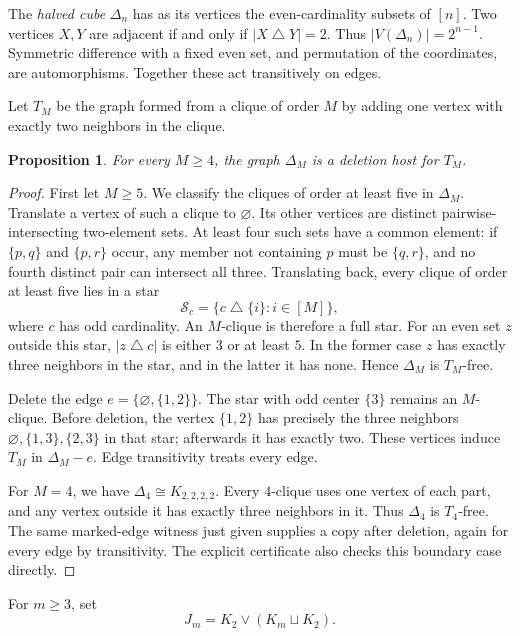\documentclass[11pt,reqno]{amsart}
\newtheorem{proposition}[theorem]{Proposition}
\theoremstyle{definition}
\theoremstyle{remark}
\newcommand{\Sym}{\mathbin{\triangle}}
\begin{document}
The \emph{halved cube} $\Delta_n$ has as its vertices the even-cardinality subsets of $[n]$. Two vertices $X,Y$ are adjacent if and only if $|X\Sym Y|=2$. Thus $|V(\Delta_n)|=2^{n-1}$. Symmetric difference with a fixed even set, and permutation of the coordinates, are automorphisms. Together these act transitively on edges.

Let $T_M$ be the graph formed from a clique of order $M$ by adding one vertex with exactly two neighbors in the clique.

\begin{proposition}\label{prop:TM}
For every $M\ge4$, the graph $\Delta_M$ is a deletion host for $T_M$.
\end{proposition}
\begin{proof}
First let $M\ge5$. We classify the cliques of order at least five in $\Delta_M$. Translate a vertex of such a clique to $\varnothing$. Its other vertices are distinct pairwise-intersecting two-element sets. At least four such sets have a common element: if $\{p,q\}$ and $\{p,r\}$ occur, any member not containing $p$ must be $\{q,r\}$, and no fourth distinct pair can intersect all three. Translating back, every clique of order at least five lies in a star
\[
 \mathcal S_c=\{c\Sym\{i\}:i\in[M]\},
\]
where $c$ has odd cardinality. An $M$-clique is therefore a full star. For an even set $z$ outside this star, $|z\Sym c|$ is either $3$ or at least $5$. In the former case $z$ has exactly three neighbors in the star, and in the latter it has none. Hence $\Delta_M$ is $T_M$-free.

Delete the edge $e=\{\varnothing,\{1,2\}\}$. The star with odd center $\{3\}$ remains an $M$-clique. Before deletion, the vertex $\{1,2\}$ has precisely the three neighbors $\varnothing,\{1,3\},\{2,3\}$ in that star; afterwards it has exactly two. These vertices induce $T_M$ in $\Delta_M-e$. Edge transitivity treats every edge.

For $M=4$, we have $\Delta_4\cong K_{2,2,2,2}$. Every $4$-clique uses one vertex of each part, and any vertex outside it has exactly three neighbors in it. Thus $\Delta_4$ is $T_4$-free. The same marked-edge witness just given supplies a copy after deletion, again for every edge by transitivity. The explicit certificate also checks this boundary case directly.
\end{proof}

For $m\ge3$, set
\[
 J_m=K_2\vee(K_m\sqcup K_2).
\]
\end{document}
